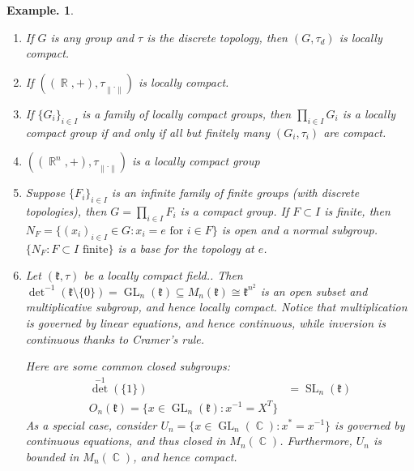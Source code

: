 \documentclass[11pt, a4paper]{memoir}
\DeclareMathOperator{\R}{{\mathbb{R}}}
\DeclareMathOperator{\C}{{\mathbb{C}}}
\newcommand{\norm}[1]{\ensuremath{\left\lVert#1\right\rVert}}
\theoremstyle{change}
\theoremstyle{plain}
\theoremstyle{nonumberplain}
\newtheorem{example}{Example.}
\DeclareMathOperator{\GL}{GL}
\DeclareMathOperator{\SL}{SL}
\numberwithin{equation}{section}
\begin{document}
\begin{example}
    \begin{enumerate}[nl,r]
        \item If $G$ is any group and $\tau$ is the discrete topology, then $(G,\tau_d)$ is locally compact.
        \item If $((\R,+),\tau_{\norm{\cdot}})$ is locally compact.
        \item If $\{G_i\}_{i\in I}$ is a family of locally compact groups, then $\prod_{i\in I}G_i$ is a locally compact group if and only if all but finitely many $(G_i,\tau_i)$ are compact.
        \item $((\R^n,+),\tau_{\norm{\cdot}})$ is a locally compact group
        \item Suppose $\{F_i\}_{i\in I}$ is an infinite family of finite groups (with discrete topologies), then $G=\prod_{i\in I}F_i$ is a compact group.
            If $F\subset I$ is finite, then $N_F=\{(x_i)_{i\in I}\in G:x_i=e\text{ for }i\in F\}$ is open and a normal subgroup.
            $\{N_F:F\subset I\text{ finite}\}$ is a base for the topology at $e$.
        \item Let $(\mathfrak{k},\tau)$ be a locally compact field..
            Then $\det^{-1}(\mathfrak{k}\setminus\{0\})=\GL_n(\mathfrak{k})\subseteq M_n(\mathfrak{k})\cong\mathfrak{k}^{n^2}$ is an open subset and multiplicative subgroup, and hence locally compact.
            Notice that multiplication is governed by linear equations, and hence continuous, while inversion is continuous thanks to Cramer's rule.

            Here are some common closed subgroups:
            \begin{align*}
                \det^{-1}(\{1\})&=\SL_n(\mathfrak{k})\\
                O_n(\mathfrak{k})=\{x\in\GL_n(\mathfrak{k}):x^{-1}=X^T\}
            \end{align*}
            As a special case, consider $U_n=\{x\in\GL_n(\C):x^*=x^{-1}\}$ is governed by continuous equations, and thus closed in $M_n(\C)$.
            Furthermore, $U_n$ is bounded in $M_n(\C)$, and hence compact.
    \end{enumerate}
\end{example}
\end{document}
